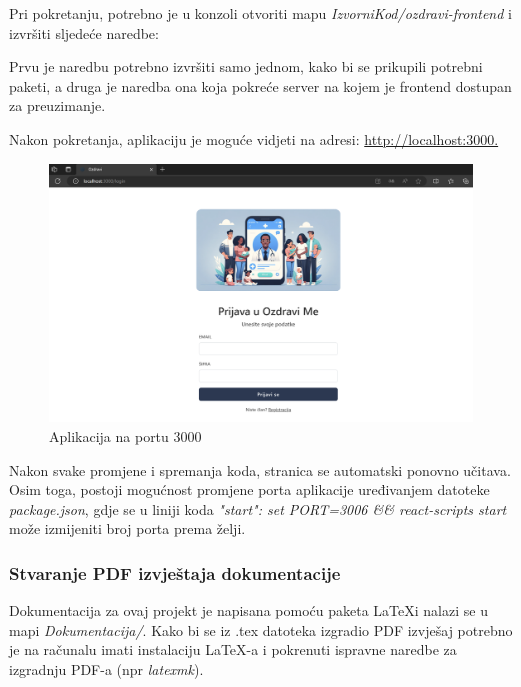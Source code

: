 			Pri pokretanju, potrebno je u konzoli otvoriti mapu \textit{IzvorniKod/ozdravi-frontend} i izvršiti sljedeće naredbe:
			

			Prvu je naredbu potrebno izvršiti samo jednom, kako bi se prikupili potrebni paketi, a druga je naredba ona koja pokreće server na kojem je frontend dostupan za preuzimanje.
			
			\newpage \noindent Nakon pokretanja, aplikaciju je moguće vidjeti na adresi: \url{http://localhost:3000.}\\
			\begin{figure}[H]
				\includegraphics[width=\textwidth]{slike/loc3000.png} 
				\caption{Aplikacija na portu 3000} 
			\end{figure}
			Nakon svake promjene i spremanja koda, stranica se automatski ponovno učitava. Osim toga, postoji mogućnost promjene porta aplikacije uređivanjem datoteke \textit{package.json}, 
			gdje se u liniji koda \textit{"start": set PORT=3006 \&\& react-scripts start} može izmijeniti broj porta prema želji.
			
			
			\subsubsection*{Stvaranje PDF izvještaja dokumentacije}
			Dokumentacija za ovaj projekt je napisana pomoću paketa \LaTeX  i nalazi se u mapi \textit{Dokumentacija/}. Kako bi se iz .tex datoteka izgradio PDF izvješaj potrebno je na računalu imati instalaciju \LaTeX-a i pokrenuti ispravne naredbe za izgradnju PDF-a (npr \textit{latexmk}).
			\eject 